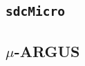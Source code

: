 \subsection{\texttt{sdcMicro}}
\label{State::SDC::sdcMicro}

\subsection{$\mu$-ARGUS}
\label{State::SDC::muARGUS}
